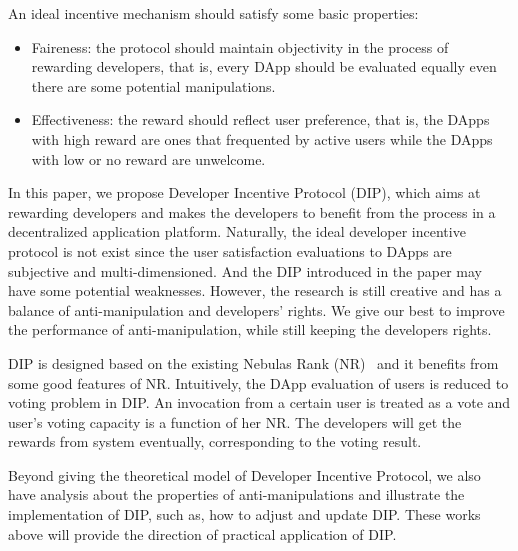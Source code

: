 An ideal incentive mechanism should satisfy some basic properties:
\begin{itemize}
\item Faireness: the protocol should maintain objectivity in the process of rewarding developers, that is, every DApp should be evaluated equally even there are some potential manipulations. 
\item Effectiveness: the reward should reflect user preference, that is, the DApps with high reward are ones that frequented by active users while the DApps with low or no reward are unwelcome.  
\end{itemize}

In this paper, we propose Developer Incentive Protocol (DIP), which aims at rewarding developers and makes the developers to benefit from the process in a decentralized application platform. Naturally, the ideal developer incentive protocol is not exist since the user satisfaction evaluations to DApps are subjective and multi-dimensioned. And the DIP introduced in the paper may have some potential weaknesses. However, the research is still creative and has a balance of anti-manipulation and developers' rights. We give our best to improve the performance of anti-manipulation, while still keeping the developers rights.

DIP is designed based on the existing Nebulas Rank (NR)~\cite{Nebulasyellowpaper} and it benefits from some good features of NR. Intuitively, the DApp evaluation of users is reduced to voting problem in DIP. An invocation from a certain user is treated as a vote and user's voting capacity is a function of her NR. The developers will get the rewards from system eventually, corresponding to the voting result.

Beyond giving the theoretical model of Developer Incentive Protocol, we also have analysis about the properties of anti-manipulations and illustrate the implementation of DIP, such as, how to adjust and update DIP. These works above will provide the direction of practical application of DIP.



